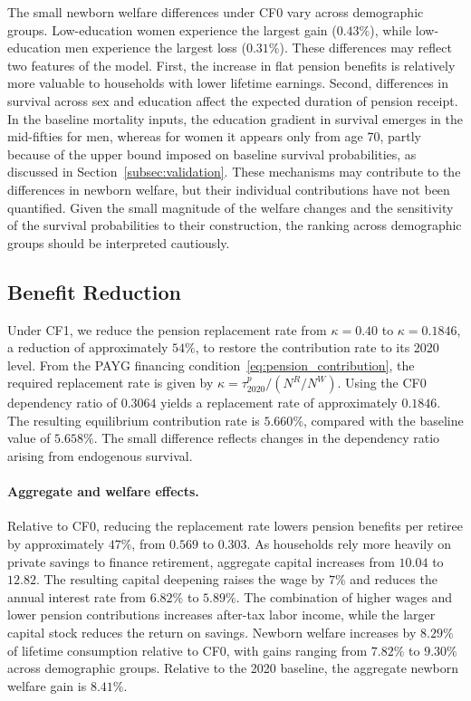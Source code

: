 \documentclass[12pt,a4paper]{article}
\begin{document}
The small newborn welfare differences under CF0 vary across demographic groups. Low-education women experience the largest gain ($0.43\%$), while low-education men experience the largest loss ($0.31\%$). These differences may reflect two features of the model. First, the increase in flat pension benefits is relatively more valuable to households with lower lifetime earnings. Second, differences in survival across sex and education affect the expected duration of pension receipt. In the baseline mortality inputs, the education gradient in survival emerges in the mid-fifties for men, whereas for women it appears only from age 70, partly because of the upper bound imposed on baseline survival probabilities, as discussed in Section~\ref{subsec:validation}. These mechanisms may contribute to the differences in newborn welfare, but their individual contributions have not been quantified. Given the small magnitude of the welfare changes and the sensitivity of the survival probabilities to their construction, the ranking across demographic groups should be interpreted cautiously.

\subsection{Benefit Reduction}
\label{subsec:exp_kappa_taum}

Under CF1, we reduce the pension replacement rate from $\kappa=0.40$ to $\kappa=0.1846$, a reduction of approximately $54\%$, to restore the contribution rate to its 2020 level. From the PAYG financing condition~\eqref{eq:pension_contribution}, the required replacement rate is given by $\kappa=\tau^p_{2020}/(N^R/N^W)$. Using the CF0 dependency ratio of $0.3064$ yields a replacement rate of approximately $0.1846$. The resulting equilibrium contribution rate is $5.660\%$, compared with the baseline value of $5.658\%$. The small difference reflects changes in the dependency ratio arising from endogenous survival.

\paragraph{Aggregate and welfare effects.}
Relative to CF0, reducing the replacement rate lowers pension benefits per retiree by approximately $47\%$, from $0.569$ to $0.303$. As households rely more heavily on private savings to finance retirement, aggregate capital increases from $10.04$ to $12.82$. The resulting capital deepening raises the wage by $7\%$ and reduces the annual interest rate from $6.82\%$ to $5.89\%$. The combination of higher wages and lower pension contributions increases after-tax labor income, while the larger capital stock reduces the return on savings. Newborn welfare increases by $8.29\%$ of lifetime consumption relative to CF0, with gains ranging from $7.82\%$ to $9.30\%$ across demographic groups. Relative to the 2020 baseline, the aggregate newborn welfare gain is $8.41\%$.
\end{document}
